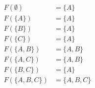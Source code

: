 \documentclass[preview]{standalone}
\begin{document}
\[
\begin{alignedat}{2}
    F(\emptyset)        &= \{A\}         \\
    F(\{A\})            &= \{A\}         \\
    F(\{B\})            &= \{A\}         \\
    F(\{C\})            &= \{A\}         \\
    F(\{A, B\})         &= \{A, B\}      \\
    F(\{A, C\})         &= \{A, B\}      \\
    F(\{B, C\})         &= \{A\}         \\
    F(\{A, B, C\})      &= \{A, B, C\}
\end{alignedat}
\]
\end{document}
